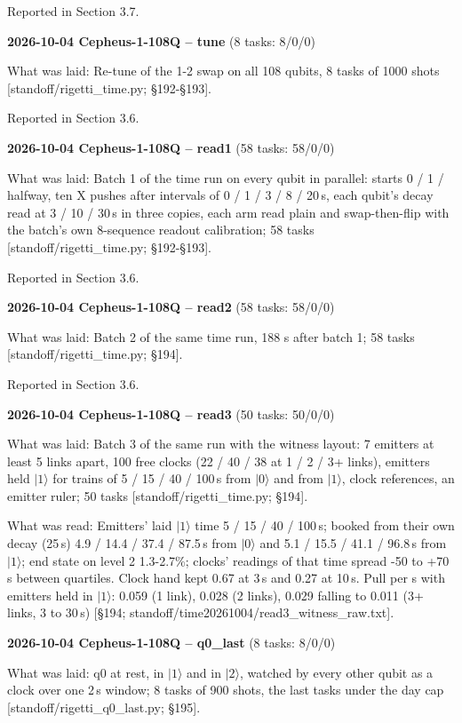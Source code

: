 \documentclass[11pt]{article}
\begin{document}
Reported in Section 3.7.

\textbf{2026-10-04 Cepheus-1-108Q -- tune} (8 tasks: 8/0/0)

What was laid: Re-tune of the 1-2 swap on all 108 qubits, 8 tasks of 1000 shots {[}standoff/rigetti\_time.py; \S{}192-\S{}193{]}.

Reported in Section 3.6.

\textbf{2026-10-04 Cepheus-1-108Q -- read1} (58 tasks: 58/0/0)

What was laid: Batch 1 of the time run on every qubit in parallel: starts 0 / 1 / halfway, ten X pushes after intervals of 0 / 1 / 3 / 8 / 20\,\textmu s, each qubit's decay read at 3 / 10 / 30\,\textmu s in three copies, each arm read plain and swap-then-flip with the batch's own 8-sequence readout calibration; 58 tasks {[}standoff/rigetti\_time.py; \S{}192-\S{}193{]}.

Reported in Section 3.6.

\textbf{2026-10-04 Cepheus-1-108Q -- read2} (58 tasks: 58/0/0)

What was laid: Batch 2 of the same time run, 188 s after batch 1; 58 tasks {[}standoff/rigetti\_time.py; \S{}194{]}.

Reported in Section 3.6.

\textbf{2026-10-04 Cepheus-1-108Q -- read3} (50 tasks: 50/0/0)

What was laid: Batch 3 of the same run with the witness layout: 7 emitters at least 5 links apart, 100 free clocks (22 / 40 / 38 at 1 / 2 / 3+ links), emitters held \(|1\rangle\) for trains of 5 / 15 / 40 / 100\,\textmu s from \(|0\rangle\) and from \(|1\rangle\), clock references, an emitter ruler; 50 tasks {[}standoff/rigetti\_time.py; \S{}194{]}.

What was read: Emitters' laid \(|1\rangle\) time 5 / 15 / 40 / 100\,\textmu s; booked from their own decay (25\,\textmu s) 4.9 / 14.4 / 37.4 / 87.5\,\textmu s from \(|0\rangle\) and 5.1 / 15.5 / 41.1 / 96.8\,\textmu s from \(|1\rangle\); end state on level 2 1.3-2.7\%; clocks' readings of that time spread -50 to +70\,\textmu s between quartiles. Clock hand kept 0.67 at 3\,\textmu s and 0.27 at 10\,\textmu s. Pull per \textmu s with emitters held in \(|1\rangle\): 0.059 (1 link), 0.028 (2 links), 0.029 falling to 0.011 (3+ links, 3 to 30\,\textmu s) {[}\S{}194; standoff/time20261004/read3\_witness\_raw.txt{]}.

\textbf{2026-10-04 Cepheus-1-108Q -- q0\_last} (8 tasks: 8/0/0)

What was laid: q0 at rest, in \(|1\rangle\) and in \(|2\rangle\), watched by every other qubit as a clock over one 2\,\textmu s window; 8 tasks of 900 shots, the last tasks under the day cap {[}standoff/rigetti\_q0\_last.py; \S{}195{]}.
\end{document}
